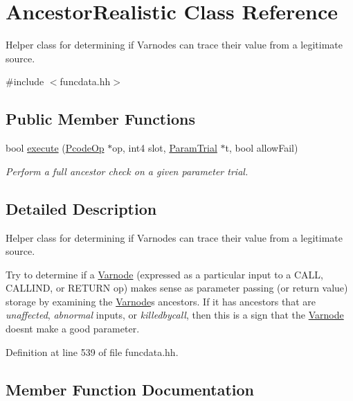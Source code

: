 \hypertarget{class_ancestor_realistic}{}\section{Ancestor\+Realistic Class Reference}
\label{class_ancestor_realistic}


Helper class for determining if Varnodes can trace their value from a legitimate source.  




{\ttfamily \#include $<$funcdata.\+hh$>$}

\subsection*{Public Member Functions}
\begin{DoxyCompactItemize}
\item 
bool \mbox{\hyperlink{class_ancestor_realistic_a5812787dc51e5f5238f8b595ed8cf084}{execute}} (\mbox{\hyperlink{class_pcode_op}{Pcode\+Op}} $\ast$op, int4 slot, \mbox{\hyperlink{class_param_trial}{Param\+Trial}} $\ast$t, bool allow\+Fail)
\begin{DoxyCompactList}\small\item\em Perform a full ancestor check on a given parameter trial. \end{DoxyCompactList}\end{DoxyCompactItemize}


\subsection{Detailed Description}
Helper class for determining if Varnodes can trace their value from a legitimate source. 

Try to determine if a \mbox{\hyperlink{class_varnode}{Varnode}} (expressed as a particular input to a C\+A\+LL, C\+A\+L\+L\+I\+ND, or R\+E\+T\+U\+RN op) makes sense as parameter passing (or return value) storage by examining the \mbox{\hyperlink{class_varnode}{Varnode}}\textquotesingle{}s ancestors. If it has ancestors that are {\itshape unaffected}, {\itshape abnormal} inputs, or {\itshape killedbycall}, then this is a sign that the \mbox{\hyperlink{class_varnode}{Varnode}} doesn\textquotesingle{}t make a good parameter. 

Definition at line 539 of file funcdata.\+hh.



\subsection{Member Function Documentation}
\mbox{\label{class_ancestor_realistic_a5812787dc51e5f5238f8b595ed8cf084}} 
